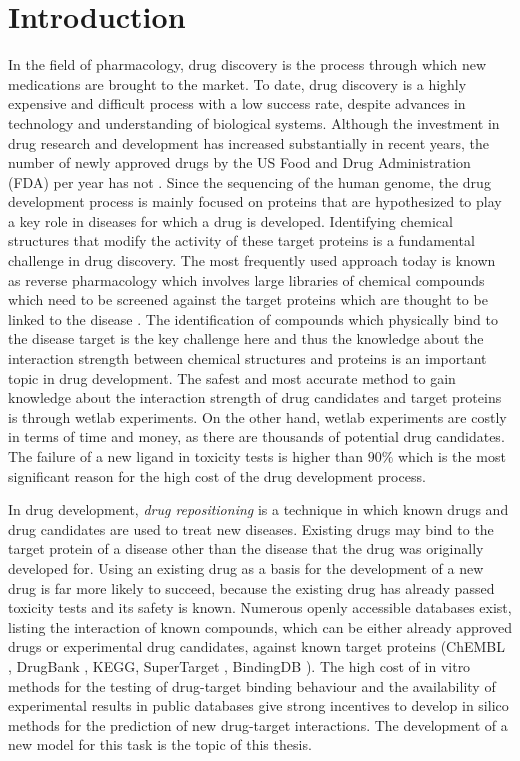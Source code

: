 
\chapter{Introduction}

In the field of pharmacology, drug discovery is the process through which new medications are brought to the market. To date, drug discovery is a highly expensive and difficult process with a low success rate, despite advances in technology and understanding of biological systems. Although the investment in drug research and development has increased substantially in recent years, the number of newly approved drugs by the US Food and Drug Administration (FDA) per year has not \cite{swinney2011were}. Since the sequencing of the human genome, the drug development process is mainly focused on proteins that are hypothesized to play a key role in diseases for which a drug is developed. Identifying chemical structures that modify the activity of these target proteins is a fundamental challenge in drug discovery. The most frequently used approach today is known as reverse pharmacology which involves large libraries of chemical compounds which need to be screened against the target proteins which are thought to be linked to the disease \cite{swinney2011were}. The identification of compounds which physically bind to the disease target is the key challenge here and thus  the knowledge about the interaction strength between chemical structures and proteins is an important topic in drug development. The safest and most accurate method to gain knowledge about the interaction strength of drug candidates and target proteins is through wetlab experiments. On the other hand, wetlab experiments are costly in terms of time and money, as there are thousands of potential drug candidates. The failure of a new ligand in toxicity tests is higher than $90\%$ which is the most significant reason for the high cost of the drug development process. 

In drug development, \textit{drug repositioning} is a technique in which known drugs and drug candidates are used to treat new diseases. Existing drugs may bind to the target protein of a disease other than the disease that the drug was originally developed for. Using an existing drug as a basis for the development of a new drug is far more likely to succeed, because the existing drug has already passed toxicity tests and its safety is known. Numerous openly accessible databases exist, listing the interaction of known compounds, which can be either already approved drugs or experimental drug candidates, against known target proteins (ChEMBL \cite{gaulton2012chembl}, DrugBank \cite{wishart2008drugbank}, KEGG\cite{kanehisa2011kegg}, SuperTarget \cite{gunther2008supertarget}, BindingDB \cite{liu2007bindingdb}). The high cost of in vitro methods for the testing of drug-target binding behaviour and the availability of experimental results in public databases give strong incentives to develop in silico methods for the prediction of new drug-target interactions. The development of a new model for this task is the topic of this thesis.

